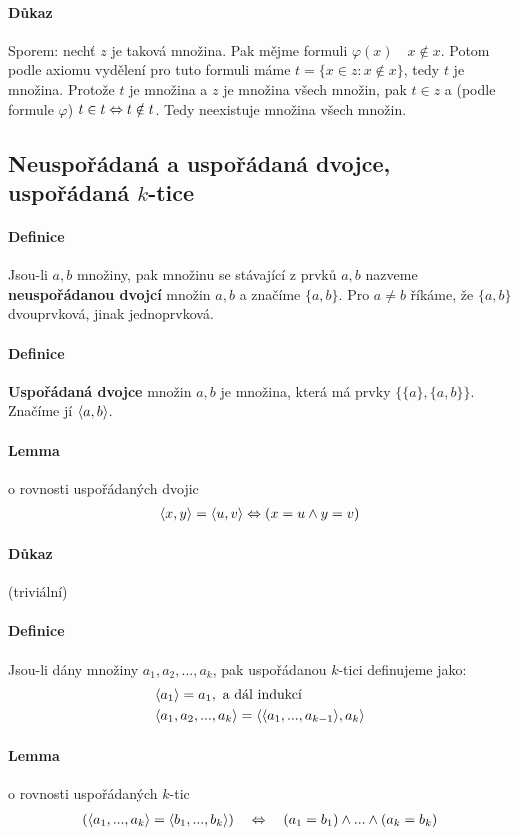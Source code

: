\documentclass[a4paper,12pt,titlepage]{article}
\begin{document}
\paragraph{Důkaz}
Sporem: nechť $z$ je taková množina. Pak mějme formuli $\varphi(x) \quad x \nin
x$. Potom podle axiomu vydělení pro tuto formuli máme $t = \{x \in z : x \nin x
\}$, tedy $t$ je množina. Protože $t$ je množina a $z$ je množina všech množin, 
pak $t \in z$ a (podle formule $\varphi$) $t \in t \Leftrightarrow t \notin t$. Tedy 
neexistuje množina všech množin.

\subsection{Neuspořádaná a uspořádaná dvojce, uspořádaná $k$-tice}
\setcounter{equation}{0}
\paragraph{Definice}
Jsou-li $a, b$ množiny, pak množinu se stávající z prvků $a,b$ nazveme
\textbf{neuspořádanou dvojcí} množin $a,b$ a značíme $\{a,b\}$. Pro $a\neq b$
říkáme, že $\{a,b\}$ dvouprvková, jinak jednoprvková.
\paragraph{Definice}
\textbf{Uspořádaná dvojce} množin $a,b$ je množina, která má prvky $\{\{a\}, 
\{a,b\}\}$. Značíme jí $\langle a,b \rangle$.
\paragraph{Lemma} o rovnosti uspořádaných dvojic
\begin{align}
	\langle x,y\rangle = \langle u,v \rangle  \Leftrightarrow (x = u \land y = v)
\end{align}
\paragraph{Důkaz} (triviální)
\paragraph{Definice}
Jsou-li dány množiny $a_1, a_2, ..., a_k$, pak uspořádanou $k$-tici definujeme
jako:
\begin{align}
	&\langle a_1 \rangle  = a_1, \text{ a dál indukcí } \\
	&\langle a_1, a_2, ..., a_k \rangle = \langle\langle a_1, ..., a_{k-1}\rangle, a_k\rangle
\end{align}
\paragraph{Lemma} o rovnosti uspořádaných $k$-tic
\begin{align}
	(\langle a_1, ..., a_k\rangle = \langle b_1, ..., b_k\rangle)
	\quad \Leftrightarrow \quad
	(a_1 = b_1) \land ... \land (a_k = b_k)
\end{align}
\end{document}
